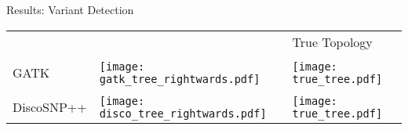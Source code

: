 \documentclass{beamer}
\begin{document}
\begin{frame}{}
\begin{columns}
\begin{block}{Results: Variant Detection}
\begin{center}
\begin{tabu} to .92\linewidth { X[-2.5,m] X[c,m] X[c,m] }
  & & True Topology \\
  & & \\
 GATK & \texttt{[image: gatk\_tree\_rightwards.pdf]} & \texttt{[image: true\_tree.pdf]} \\
  & & \\
 DiscoSNP++ & \texttt{[image: disco\_tree\_rightwards.pdf]} & \texttt{[image: true\_tree.pdf]}
\end{tabu}
\end{center}



\end{block}





\end{columns}
\end{frame}
\end{document}
